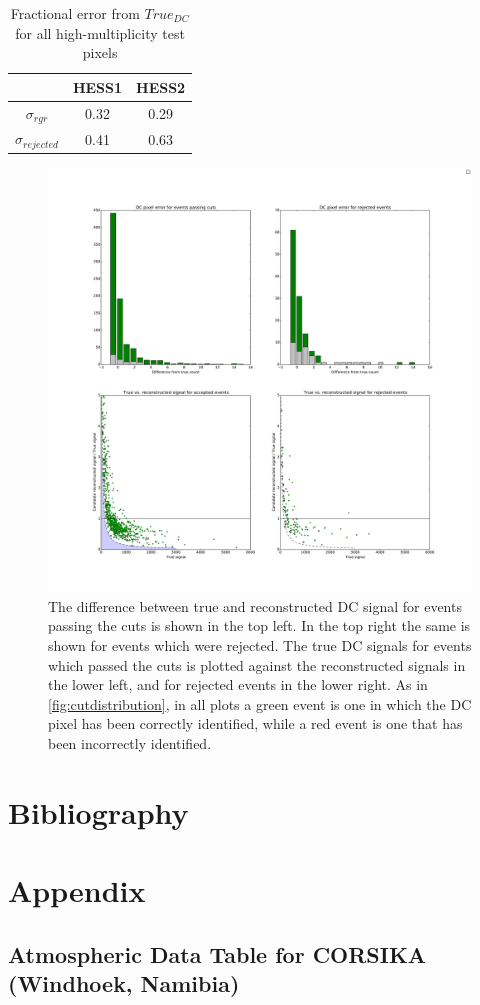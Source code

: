 \documentclass{article}
\begin{document}
\begin{table}[h!]
  \centering
  \caption{Fractional error from $True_{DC}$ for all high-multiplicity test pixels}
  \label{tab:altlpderror}
  \begin{tabular}{ccc}
    \toprule
    & HESS1 & HESS2\\
    \midrule
    $\sigma_{rgr}$ & 0.32 & 0.29\\ 
    $\sigma_{rejected}$ & 0.41 & 0.63\\ 
    \bottomrule
  \end{tabular}
\end{table}

\begin{figure}
\begin{center}
\includegraphics[width=\textwidth]{DCcounterrorhess1rgrbigtestdata}
\caption{The difference between true and reconstructed DC signal for events passing the cuts is shown in the top left. In the top right the same is shown for events which were rejected. The true DC signals for events which passed the cuts is plotted against the reconstructed signals in the lower left, and for rejected events in the lower right. As in \ref{fig:cutdistribution}, in all plots a green event is one in which the DC pixel has been correctly identified, while a red event is one that has been incorrectly identified.}
\label{fig:dcdiff}
\end{center}
\end{figure}
\section{Bibliography}


\section{Appendix}
\subsection{Atmospheric Data Table for CORSIKA (Windhoek, Namibia)}
\end{document}
